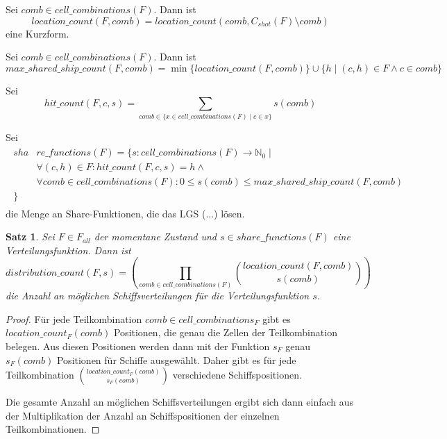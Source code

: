 \documentclass[a4paper,12pt]{llncs}
\numberwithin{equation}{section}
\newtheorem{satz}{Satz}
\begin{document}
\begin{definition}
Sei $comb \in cell\_combinations(F)$. Dann ist
\[
location\_count(F,comb)=location\_count(comb, C_{shot}(F) \setminus comb)
\]
eine Kurzform.
\end{definition}

\begin{definition}
Sei $comb \in cell\_combinations(F)$. Dann ist
\[
max\_shared\_ship\_count(F,comb)=\min\{location\_count(F, comb)\} \cup \{h \mid (c,h) \in F \wedge c \in comb\}
\]
\end{definition}

\begin{definition}
Sei
\[
hit\_count(F, c, s)=\sum_{comb \in \{x \in cell\_combinations(F) \mid c \in x\}}{s(comb)}
\]
\end{definition}

\begin{definition}
Sei
\begin{align}
\begin{split}
sha&re\_functions(F)=\{s \colon cell\_combinations(F) \rightarrow \mathbb{N}_0 \mid\\
&\forall{(c,h) \in F}\colon hit\_count(F, c, s)=h \wedge \\
&\forall{comb \in cell\_combinations(F)} \colon 0 \leq s(comb) \leq max\_shared\_ship\_count(F, comb)\\
\}\;\;\;& \nonumber
\end{split}
\end{align}
die Menge an Share-Funktionen, die das LGS (...) lösen.
\end{definition}

\begin{satz}
Sei $F\in F_{all}$ der momentane Zustand und $s \in share\_functions(F)$ eine Verteilungsfunktion.
Dann ist
\[
distribution\_count(F, s)=
\left( \prod_{comb \in cell\_combinations(F)}{{location\_count(F, comb)\choose s(comb)}} \right)
\]
die Anzahl an möglichen Schiffsverteilungen für die Verteilungsfunktion $s$.
\end{satz}

\begin{proof}
Für jede Teilkombination $comb \in cell\_combinations_F$ gibt es $location\_count_F(comb)$ Positionen, die genau die Zellen der Teilkombination belegen. Aus diesen Positionen werden dann mit der Funktion $s_F$ genau $s_F(comb)$ Positionen für Schiffe ausgewählt. Daher gibt es für jede Teilkombination ${location\_count_F(comb)\choose s_F(comb)}$ verschiedene Schiffspositionen.

Die gesamte Anzahl an möglichen Schiffsverteilungen ergibt sich dann einfach aus der Multiplikation der Anzahl an Schiffspositionen der einzelnen Teilkombinationen.
\end{proof}
\end{document}
